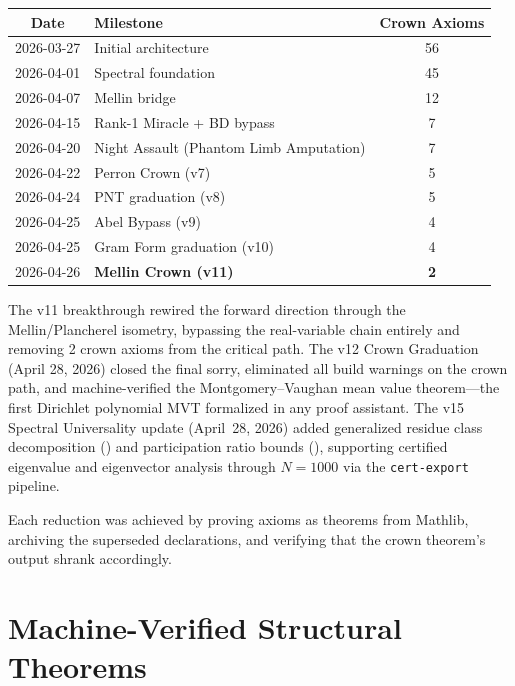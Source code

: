 \documentclass[11pt,a4paper]{article}
\begin{document}
\begin{center}
\begin{tabular}{@{}clc@{}}
\toprule
\textbf{Date} & \textbf{Milestone} & \textbf{Crown Axioms} \\
\midrule
2026-03-27 & Initial architecture & 56 \\
2026-04-01 & Spectral foundation & 45 \\
2026-04-07 & Mellin bridge & 12 \\
2026-04-15 & Rank-1 Miracle + BD bypass & 7 \\
2026-04-20 & Night Assault (Phantom Limb Amputation) & 7 \\
2026-04-22 & Perron Crown (v7) & 5 \\
2026-04-24 & PNT graduation (v8) & 5 \\
2026-04-25 & Abel Bypass (v9) & 4 \\
2026-04-25 & Gram Form graduation (v10) & 4 \\
2026-04-26 & \textbf{Mellin Crown (v11)} & \textbf{2} \\
\bottomrule
\end{tabular}
\end{center}

The v11 breakthrough rewired the forward direction through the
Mellin/Plancherel isometry, bypassing the real-variable chain entirely
and removing 2 crown axioms from the critical path.
The v12 Crown Graduation (April 28, 2026) closed the final
 sorry, eliminated all build
warnings on the crown path, and machine-verified the
Montgomery--Vaughan mean value theorem---the first Dirichlet
polynomial MVT formalized in any proof assistant.
The v15 Spectral Universality update (April~28, 2026) added
generalized residue class decomposition ()
and participation ratio bounds (),
supporting certified eigenvalue and eigenvector analysis through
$N = 1000$ via the \texttt{cert-export} pipeline.

Each reduction was achieved by proving axioms as theorems from
Mathlib, archiving the superseded declarations, and verifying
that the crown theorem's  output shrank
accordingly.

\section{Machine-Verified Structural Theorems}
\label{sec:structural}
\end{document}
